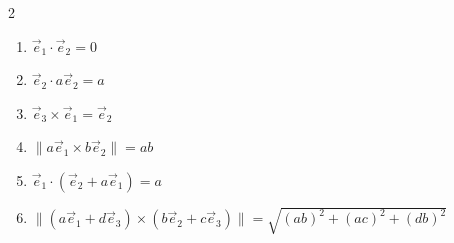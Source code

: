 \begin{sol}
      \begin{multicols}{2}
            
    \begin{enumerate}
        
    \item$\vec{e}_1\cdot\vec{e}_2=0$
    \item$\vec{e}_2\cdot a\vec{e}_2= a$
    \item$\vec{e}_3\times \vec{e}_1=\vec{e}_2$
    \item$\|a\vec{e}_1\times b\vec{e}_2\|=ab$
    \item$\vec{e}_1\cdot (\vec{e}_2+a\vec{e}_1 )=a$
    \item$\|(a\vec{e}_1+d\vec{e}_3)\times (b\vec{e}_2+c\vec{e}_3)\|=\sqrt{(ab)^2+(ac)^2+(db)^2}$
        \end{enumerate}
        \end{multicols}

\end{sol}

